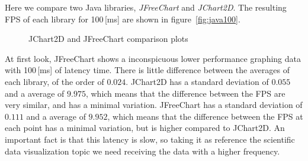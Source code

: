 Here we compare two Java libraries,
\emph{JFreeChart} and \emph{JChart2D}.
The resulting FPS of each library
for 100\,[ms] are shown in figure~\ref{fig:java100}.
\begin{figure}%
  \label{fig:figure1}
  \caption{JChart2D and JFreeChart comparison plots}
\end{figure}
At first look, JFreeChart shows a inconspicuous lower performance graphing data
with 100\,[ms] of latency time.
There is little difference between the averages
of each library, of the order of $0.024$.
JChart2D has a standard deviation of $0.055$ and a average of $9.975$, which means that
the difference between the FPS are very similar, and has a minimal variation.
JFreeChart has a standard deviation of $0.111$ and a average of $9.952$, which means that
the difference between the FPS at each point has a minimal variation, but is higher compared
to JChart2D.
An important fact is that this latency is slow, so taking it as
reference the scientific data visualization topic we need receiving the data
with a higher frequency.

